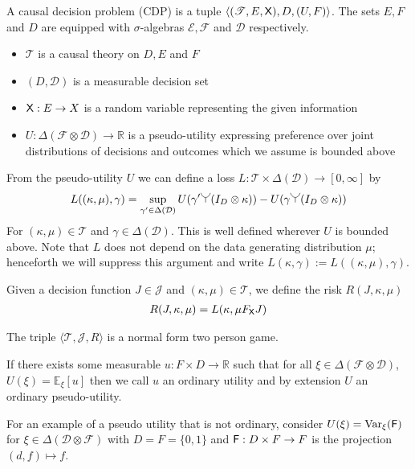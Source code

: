 \begin{definition}\label{def:CDP}
A causal decision problem (CDP) is a tuple $\langle (\mathscr{T}, E, \mathsf{X}), D, (U,F) \rangle$. The sets $E,F$ and $D$ are equipped with $\sigma$-algebras $\mathcal{E},\mathcal{F}$ and $\mathcal{D}$ respectively.

\begin{itemize}
    \item $\mathscr{T}$ is a causal theory on $D, E$ and $F$
    \item $(D,\mathcal{D})$ is a measurable decision set
    \item $\mathsf{X}:E\to X$ is a random variable representing the given information
    \item $U:\Delta(\mathcal{F}\otimes \mathcal{D})\to \mathbb{R}$ is a pseudo-utility expressing preference over joint distributions of decisions and outcomes which we assume is bounded above
\end{itemize}

From the pseudo-utility $U$ we can define a loss $L:\mathscr{T}\times\Delta(\mathcal{D})\to [0,\infty]$ by
\begin{align}
    L((\kappa,\mu),\gamma) = \sup_{\gamma'\in\Delta(\mathcal{D})} U(\gamma'\splitter{0.15}(I_D\otimes \kappa)) - U(\gamma\splitter{0.15}(I_D\otimes \kappa))\label{eq:canonical_loss}
\end{align}
For $(\kappa,\mu)\in \mathscr{T}$ and $\gamma\in \Delta(\mathcal{D})$. This is well defined wherever $U$ is bounded above. Note that $L$ does not depend on the data generating distribution $\mu$; henceforth we will suppress this argument and write $L(\kappa,\gamma):= L((\kappa,\mu),\gamma)$.

Given a decision function $J\in\mathscr{J}$ and $(\kappa,\mu)\in \mathscr{T}$, we define the risk $R(J,\kappa,\mu)$
\begin{align}
    R(J,\kappa,\mu) = L(\kappa,\mu F_{\mathsf{X}} J) 
\end{align}

The triple $\langle \mathscr{T}, \mathscr{J}, R\rangle$ is a normal form two person game.

If there exists some measurable $u:F\times D\to \mathbb{R}$ such that for all $\xi\in \Delta(\mathcal{F}\otimes\mathcal{D})$, $U(\xi)=\mathbb{E}_{\xi}[u]$ then we call $u$ an ordinary utility and by extension $U$ an ordinary pseudo-utility.

For an example of a pseudo utility that is not ordinary, consider $U(\xi) = \text{Var}_{\xi}(\mathsf{F})$ for $\xi\in\Delta(\mathcal{D}\otimes\mathcal{F})$ with $D=F=\{0,1\}$ and $\mathsf{F}:D\times F\to F$ is the projection $(d,f)\mapsto f$.


\end{definition}
